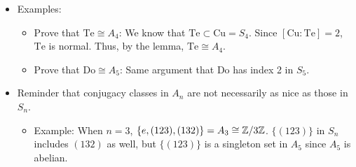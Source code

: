 \documentclass[../notes.tex]{subfiles}
\begin{document}
\begin{itemize}
\begin{proof}
    \end{proof}
    \item Examples:
    \begin{itemize}
        \item Prove that $\text{Te}\cong A_4$: We know that $\text{Te}\subset\text{Cu}=S_4$. Since $[\text{Cu}:\text{Te}]=2$, $\text{Te}$ is normal. Thus, by the lemma, $\text{Te}\cong A_4$.
        \item Prove that $\text{Do}\cong A_5$: Same argument that $\text{Do}$ has index 2 in $S_5$.
    \end{itemize}
    \item Reminder that conjugacy classes in $A_n$ are not necessarily as nice as those in $S_n$.
    \begin{itemize}
        \item Example: When $n=3$, $\{e,(123),(132)\}=A_3\cong\mathbb{Z}/3\mathbb{Z}$. $\{(123)\}$ in $S_n$ includes $(132)$ as well, but $\{(123)\}$ is a singleton set in $A_5$ since $A_5$ is abelian.
    \end{itemize}
\end{itemize}
\end{document}

